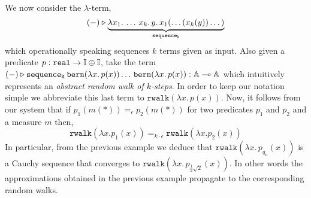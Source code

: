 \documentclass[a4paper,UKenglish,cleveref, autoref, thm-restate]{lipics-v2021}
\begin{document}
\begin{example} 
        We now consider the $\lambda$-term,
        \[
                (-) \triangleright \underbrace{\lambda x_1. \, \dots \, x_k. \, y. \,
                x_1 (\dots (x_k(y)) \dots)}_{\mathtt{sequence_k}}
        \]
        which operationally speaking sequences $k$ terms given as input. Also
        given a predicate $p : \mathtt{real} \to \mathbb{I} \oplus \mathbb{I}$, take
        the term $(-) \triangleright \mathtt{sequence_k} \>
        \mathtt{bern}(\lambda x. \, p(x)) \dots \, \mathtt{bern}(\lambda x. \,
        p(x)) : \mathbb{A} \multimap \mathbb{A}$ which intuitively represents an
        \emph{abstract random walk of $k$-steps}. In order to keep our notation
        simple we abbreviate this last term to $\mathtt{rwalk}(\lambda x. \,
        p(x))$. Now, it follows from our system that if $p_1(m(\ast)) =_\epsilon
        p_2(m(\ast))$ for two predicates $p_1$ and $p_2$ and a measure $m$ then,
        \[
                \mathtt{rwalk}(\lambda x. p_1(x)) =_{k \cdot \epsilon}
                \mathtt{rwalk}(\lambda x. p_2(x)) 
        \]
        In particular, from the previous example we deduce that $\mathtt{rwalk}
        (\lambda x. \, p_{q_n} (x))$ is a Cauchy sequence that converges to
        $\mathtt{rwalk}(\lambda x.  \, p_{\frac{1}{2} \sqrt{2}} (x) )$. In
        other words the approximations obtained in the previous example
        propagate to the corresponding random walks.


\end{example}
\end{document}
